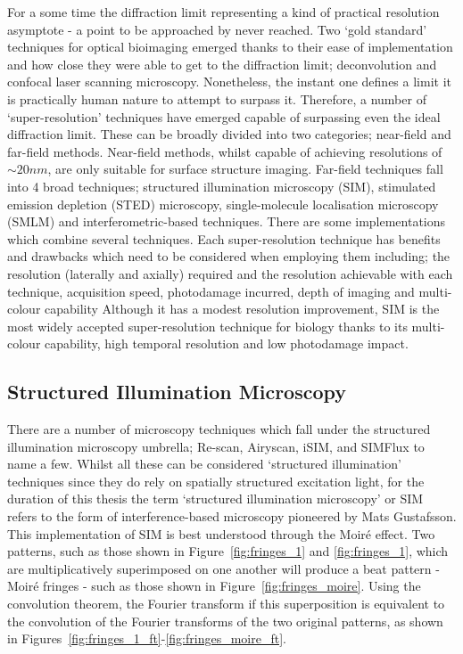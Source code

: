 For a some time the diffraction limit representing a kind of practical 
resolution asymptote - a point to be approached by never reached. Two
`gold standard' techniques for optical bioimaging emerged thanks to their
ease of implementation and how close they were able to get to the diffraction
limit; deconvolution\cite{agard1983three, wallace2001workingperson} and
confocal laser scanning microscopy\cite{sheppard1981theory,minsky1988memoir}. 
Nonetheless, the instant one defines a limit it is practically human nature 
to attempt to surpass it. Therefore, a number of `super-resolution' techniques
have emerged capable of surpassing even the ideal diffraction limit. These
can be broadly divided into two categories; near-field and far-field methods.
Near-field methods, whilst capable of achieving resolutions of $\sim 20 nm$,
are only suitable for surface structure imaging\cite{schermelleh2010guide}. 
Far-field techniques fall into 4 broad techniques; structured illumination
microscopy (SIM), stimulated emission depletion (STED) microscopy, 
single-molecule localisation microscopy (SMLM) and interferometric-based 
techniques. There are some implementations which combine several 
techniques. Each super-resolution technique has benefits and drawbacks which 
need to be considered when employing them including; the resolution 
(laterally and axially) required and the resolution achievable with each 
technique, acquisition speed, photodamage incurred, depth of imaging and 
multi-colour capability\cite{hell20152015,schermelleh2019super} Although it 
has a modest resolution improvement, SIM is the most widely accepted 
super-resolution technique for biology thanks to its multi-colour capability,
high temporal resolution and low photodamage impact\cite{leung2011review}.

\subsection{Structured Illumination Microscopy}
\label{subsec:SIM}

There are a number of microscopy techniques which fall under the structured
illumination microscopy umbrella; Re-scan\cite{de2013re}, 
Airyscan\cite{huff2015airyscan}, iSIM\cite{york2013instant,curd2015construction},
and SIMFlux\cite{cnossen2020localization} to name a few. Whilst all these can be 
considered `structured illumination' techniques since they do rely on spatially 
structured excitation light, for the duration of this thesis the term 
`structured illumination microscopy' or SIM refers to the form of 
interference-based microscopy pioneered by Mats 
Gustafsson\cite{gustafsson1999extended,gustafsson2000surpassing,gustafsson2008three}.
This implementation of SIM is best understood through the Moir\'{e} effect.
Two patterns, such as those shown in Figure~\ref{fig:fringes_1} and 
\ref{fig:fringes_1}, which are multiplicatively superimposed on one another
will produce a beat pattern - Moir\'{e} fringes - such as those shown in
Figure~\ref{fig:fringes_moire}. Using the convolution theorem, the Fourier
transform if this superposition is equivalent to the convolution of the 
Fourier transforms of the two original patterns\cite{mcgillem1991continuous},
as shown in Figures~\ref{fig:fringes_1_ft}-\ref{fig:fringes_moire_ft}. 


